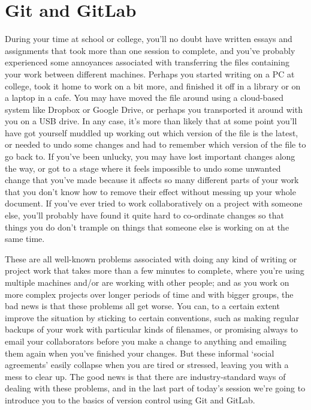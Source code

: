 
\section{Git and GitLab}

During your time at school or college, you'll no doubt have written essays and assignments that took more than one session to complete, and you've probably experienced some annoyances associated with transferring the files containing your work between different machines. Perhaps you started writing on a PC at college, took it home to work on a bit more, and finished it off in a library or on a laptop in a cafe. You may have moved the file around using a cloud-based system like Dropbox or Google Drive, or perhaps you transported it around with you on a USB drive. In any case, it's more than likely that at some point you'll have got yourself muddled up working out which version of the file is the latest, or needed to undo some changes and had to remember which version of the file to go back to. If you've been unlucky, you may have lost important changes along the way, or got to a stage where it feels impossible to undo some unwanted change that you've made because it affects so many different parts of your work that you don't know how to remove their effect without messing up your whole document. If you've ever tried to work collaboratively on a project with someone else, you'll probably have found it quite hard to co-ordinate changes so that things you do don't trample on things that someone else is working on at the same time. 

These are all well-known problems associated with doing any kind of writing or project work that takes more than a few minutes to complete, where you're using multiple machines and/or are working with other people; and as you work on more complex projects over longer periods of time and with bigger groups, the bad news is that these problems all get worse. You can, to a certain extent improve the situation by sticking to certain conventions, such as making regular backups of your work with particular kinds of filenames, or promising always to email your collaborators before you make a change to anything and emailing them again when you've finished your changes. But these informal `social agreements' easily collapse when you are tired or stressed, leaving you with a mess to clear up. The good news is that there are industry-standard ways of dealing with these problems, and in the last part of today's session we're going to introduce you to the basics of version control using Git and GitLab. 

